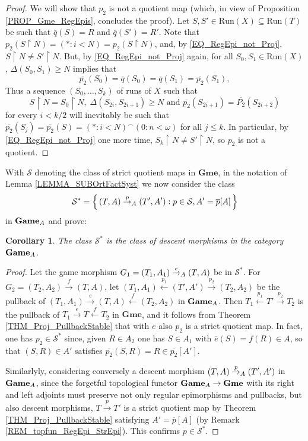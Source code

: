 \documentclass[12pt]{amsart}
\newtheorem{cor}[thm]{Corollary}
\theoremstyle{definition}
\newcommand{\set}[1]{\left\{\, {#1} \,\right\}}
\newcommand{\seq}[1]{{\left( {#1} \right)}}
\newcommand{\A}{\textup{\textmd{\textsc{A}}}}
\newcommand{\Run}{{\mathrm{Run}}}
\DeclareMathOperator{\restrict}{\upharpoonright}
\newcommand{\Games}{\mathbf{Game}}
\newcommand{\Gmes}{\mathbf{Gme}}
\begin{document}
\begin{proof}
	We will show that $p_2$ is not a quotient map (which, in view of Proposition \ref{PROP_Gme_RegEpis}, concludes the proof). Let $S,S'\in \Run(X)\subseteq \Run(T)$ be such that $\overline{q}(S) = R$ and $\overline{q}(S')=R'$. Note that $p_2(S\restrict N) = \seq{\ast:i<N} = p_2(S\restrict N)$, and, by \eqref{EQ_RegEpi_not_Proj}, $S\restrict N \neq S'\restrict N$. But, by \eqref{EQ_RegEpi_not_Proj} again, for all $S_0,S_1\in \Run(X)$, $\Delta(S_0,S_1)\ge N$ implies that 
	\[
	\overline{p_2}(S_0) = \overline{q}(S_0) = \overline{q}(S_1) = \overline{p_2}(S_1),
	\]
	Thus a sequence $\seq{S_0, \dotsc, S_k}$ of runs of $X$ such that 
	\[
	S\restrict N = S_0\restrict N, \; \Delta(S_{2i}, S_{2i+1})\ge N \text{  and  } \overline{p_2}(S_{2i+1}) = \overline{P_2}(S_{2i+2})
	\]
	for every $i < k/2$ will inevitably be such that $\overline{p_2}(S_j) = \overline{p_2}(S) = \seq{\ast:i<N}^\smallfrown \seq{0:n<\omega}$ for all $j\le k$. In particular, by \eqref{EQ_RegEpi_not_Proj} one more time, $S_k\restrict N \neq S'\restrict N$, so $p_2$ is not a quotient.
\end{proof}

With $\mathcal S$ denoting the class of strict quotient maps in $\Gmes$, in the notation of Lemma \ref{LEMMA_SUBOrtFactSyst} we now consider the class
\[
\mathcal{S}^* = \set{(T,A)\stackrel{p}{\to}_\A (T',A'): p\in\mathcal S,  A' = \overline{p}[A]}
\]
in $\Games_{\A}$ and prove:

\begin{cor}\label{THM_Game_Proj_PullbackStable}
	The class $\mathcal S^*$ is the class of descent morphisms in the category $\Games_{\A}$. 
\end{cor}
\begin{proof}
	Let the game morphism $G_1=(T_1,A_1)\stackrel{e}{\to}_\A (T,A)$ be in $\mathcal{S}^*$. For $G_2 = (T_2,A_2)\stackrel{f}{\to} (T,A)$, let $(T_1,A_1)\stackrel{p_1}{\leftarrow}(T',A') \stackrel{p_2}{\to} (T_2,A_2)$  be the pullback of $(T_1, A_1)\stackrel{e}{\to}(T,A)\stackrel{f}{\leftarrow}(T_2,A_2)$ in $\Games_{\A}$. Then  
	$T_1\stackrel{p_1}{\leftarrow}T' \stackrel{p_2}{\to} T_2$ is the pullback of $T_1\stackrel{e}{\to}T\stackrel{f}{\leftarrow}T_2$ in $\Gmes$, and it follows from Theorem \ref{THM_Proj_PullbackStable} that with $e$ also $p_2$ is a strict quotient map. In fact,  one has $p_2\in \mathcal{S}^*$ since, given $R\in A_2$ one has $S\in A_1$ with $\overline{e}(S) = \overline{f}(R)\in A$, so that  $(S,R)\in A'$ satisfies $\overline{p_2}(S,R) = R\in\overline{p_2}[A']$.
	
	Similarlyly, considering conversely a descent  morphism $(T,A)\stackrel{p}{\to}_\A(T',A')$ in $\Games_\A$, since the forgetful topological functor $\Games_{\A}\to \Gmes$ with its right and left adjoints must preserve not only regular epimorphisms and pullbacks, but also descent morphisms, $T\stackrel{p}{\to}T'$ is a strict quotient map by Theorem \ref{THM_Proj_PullbackStable}	satisfying $A' = \overline{p}[A]$ (by Remark \ref{REM_topfun_RegEpi_StrEpi}). This confirms $p\in\mathcal S^*$.	
\end{proof}
\end{document}
